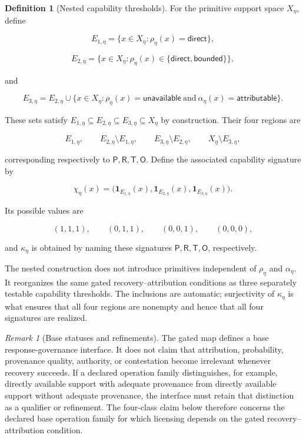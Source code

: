 \documentclass[11pt]{article}
\theoremstyle{definition}
\newtheorem{definition}[proposition]{Definition}
\theoremstyle{remark}
\newtheorem{remark}[proposition]{Remark}
\begin{document}
\begin{definition}[Nested capability thresholds]
\label{def:nested-capability-thresholds}
For the primitive support space \(X_{\eta}\), define

\[
E_{1,\eta}=\{x\in X_{\eta}:\rho_{\eta}(x)=\mathsf{direct}\},
\]

\[
E_{2,\eta}=\{x\in X_{\eta}:\rho_{\eta}(x)\in\{\mathsf{direct},\mathsf{bounded}\}\},
\]

and

\[
E_{3,\eta}=E_{2,\eta}\cup\{x\in X_{\eta}:\rho_{\eta}(x)=\mathsf{unavailable}\ \text{and}\ \alpha_{\eta}(x)=\mathsf{attributable}\}.
\]

These sets satisfy \(E_{1,\eta}\subseteq E_{2,\eta}\subseteq E_{3,\eta}\subseteq X_{\eta}\) by construction. Their four regions are

\[
E_{1,\eta},\qquad E_{2,\eta}\setminus E_{1,\eta},\qquad E_{3,\eta}\setminus E_{2,\eta},\qquad X_{\eta}\setminus E_{3,\eta},
\]

corresponding respectively to \(\mathsf P,\mathsf R,\mathsf T,\mathsf O\). Define the associated capability signature by

\[
\chi_{\eta}(x)=\bigl(\mathbf{1}_{E_{1,\eta}}(x),\mathbf{1}_{E_{2,\eta}}(x),\mathbf{1}_{E_{3,\eta}}(x)\bigr).
\]

Its possible values are

\[
(1,1,1),\qquad(0,1,1),\qquad(0,0,1),\qquad(0,0,0),
\]

and \(\kappa_{\eta}\) is obtained by naming these signatures \(\mathsf P,\mathsf R,\mathsf T,\mathsf O\), respectively.
\end{definition}

The nested construction does not introduce primitives independent of \(\rho_{\eta}\) and \(\alpha_{\eta}\). It reorganizes the same gated recovery--attribution conditions as three separately testable capability thresholds. The inclusions are automatic; surjectivity of \(\kappa_{\eta}\) is what ensures that all four regions are nonempty and hence that all four signatures are realized.

\begin{remark}[Base statuses and refinements]
\label{rem:base-status-refinements}
The gated map defines a base response-governance interface. It does not claim that attribution, probability, provenance quality, authority, or contestation become irrelevant whenever recovery succeeds. If a declared operation family distinguishes, for example, directly available support with adequate provenance from directly available support without adequate provenance, the interface must retain that distinction as a qualifier or refinement. The four-class claim below therefore concerns the declared base operation family for which licensing depends on the gated recovery--attribution condition.
\end{remark}
\end{document}
